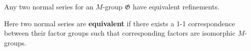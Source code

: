 Any two normal series for an $M$-group $\mathfrak{G}$ have equivalent refinements.

Here two normal series are \textbf{equivalent} if there exists a 1-1 correspondence between their factor groups such that corresponding factors are isomorphic $M$-groups.
